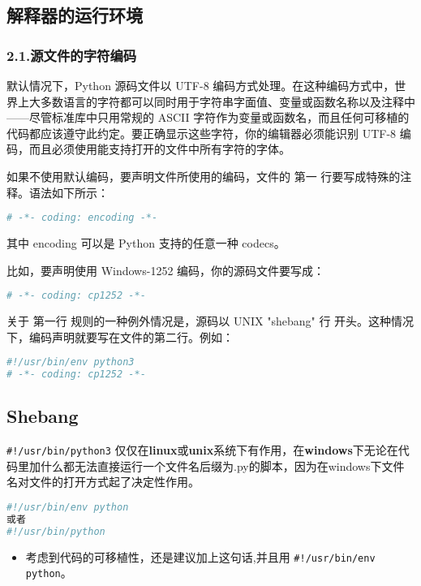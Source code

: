 \subsection{解释器的运行环境}

\subsubsection{2.1.源文件的字符编码}

默认情况下，Python 源码文件以 UTF-8 编码方式处理。在这种编码方式中，世界上大多数语言的字符都可以同时用于字符串字面值、变量或函数名称以及注释中——尽管标准库中只用常规的 ASCII 字符作为变量或函数名，而且任何可移植的代码都应该遵守此约定。要正确显示这些字符，你的编辑器必须能识别 UTF-8 编码，而且必须使用能支持打开的文件中所有字符的字体。

如果不使用默认编码，要声明文件所使用的编码，文件的 第一 行要写成特殊的注释。语法如下所示：

\begin{lstlisting}[language=python]
# -*- coding: encoding -*-
\end{lstlisting}
其中 encoding 可以是 Python 支持的任意一种 codecs。

比如，要声明使用 Windows-1252 编码，你的源码文件要写成：

\begin{lstlisting}[language=python]
# -*- coding: cp1252 -*-
\end{lstlisting}
关于 第一行 规则的一种例外情况是，源码以 UNIX "shebang" 行 开头。这种情况下，编码声明就要写在文件的第二行。例如：

\begin{lstlisting}[language=python]
#!/usr/bin/env python3
# -*- coding: cp1252 -*-
\end{lstlisting}

\subsection{Shebang}
\verb|#!/usr/bin/python3| 仅仅在\textbf{linux}或\textbf{unix}系统下有作用，在\textbf{windows}下无论在代码里加什么都无法直接运行一个文件名后缀为.py的脚本，因为在windows下文件名对文件的打开方式起了决定性作用。
\begin{lstlisting}[language=python]
#!/usr/bin/env python
或者
#!/usr/bin/python
\end{lstlisting}
\begin{itemize}
\item 考虑到代码的可移植性，还是建议加上这句话,并且用 \verb|#!/usr/bin/env python|。
\end{itemize}

